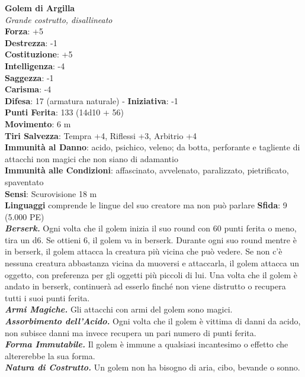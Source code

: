 \begin{multicols}{2}
\medskip\textbf{Golem di Argilla}\\
\emph{Grande costrutto, disallineato}\\
\textbf{Forza}: +5\\
\textbf{Destrezza}: -1\\
\textbf{Costituzione}: +5\\
\textbf{Intelligenza}: -4\\
\textbf{Saggezza}: -1\\
\textbf{Carisma}: -4\\
\textbf{Difesa}: 17 (armatura naturale) - \textbf{Iniziativa}: -1\\
\textbf{Punti Ferita}: 133 (14d10 + 56)\\
\textbf{Movimento}: 6 m\\
\textbf{Tiri Salvezza}: Tempra +4, Riflessi +3, Arbitrio +4\\
\textbf{Immunità al Danno}: acido, psichico, veleno; da botta, perforante e tagliente di attacchi non magici che non siano di adamantio\\
\textbf{Immunità alle Condizioni}: affascinato, avvelenato, paralizzato, pietrificato, spaventato\\
\textbf{Sensi}: Scurovisione 18 m\\
\textbf{Linguaggi} comprende le lingue del suo creatore ma non può parlare
\textbf{Sfida}: 9 (5.000 PE)\smallskip\\
\emph{\textbf{Berserk.}} Ogni volta che il golem inizia il suo round con 60 punti ferita o meno, tira un d6. Se ottieni 6, il golem va in berserk. Durante ogni suo round mentre è in berserk, il golem attacca la creatura più vicina che può vedere. Se non c'è nessuna creatura abbastanza vicina da muoversi e attaccarla, il golem attacca un oggetto, con preferenza per gli oggetti più piccoli di lui. Una volta che il golem è andato in berserk, continuerà ad esserlo finché non viene distrutto o recupera tutti i suoi punti ferita.\\
\emph{\textbf{Armi Magiche.}} Gli attacchi con armi del golem sono magici.\\
\emph{\textbf{Assorbimento dell'Acido.}} Ogni volta che il golem è vittima di danni da acido, non subisce danni ma invece recupera un pari numero di punti ferita.\\
\emph{\textbf{Forma Immutabile.}} Il golem è immune a qualsiasi incantesimo o effetto che altererebbe la sua forma. \\
\emph{\textbf{Natura di Costrutto.}} Un golem non ha bisogno di aria, cibo, bevande o sonno.\\

\end{multicols}
